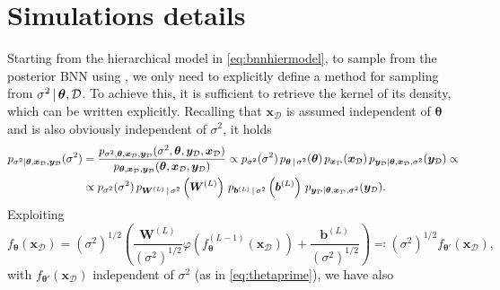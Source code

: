 \section{Simulations details} \label{sec:simulationsdetails}

Starting from the hierarchical model in \cref{eq:bnnhiermodel}, to sample from the posterior BNN using , we only need to explicitly define a method for sampling from $\sigma^2 \, | \, \bm{\theta}, \mathcal{D}$. 
To achieve this, it is sufficient to retrieve the kernel of its density, which can be written explicitly. 
Recalling that $\bm{x}_{\mathcal{D}}$ is assumed independent of $\bm{\theta}$ and is also obviously independent of $\sigma^2$, it holds
\begin{equation} \label{eq:conditionaldistsigmaprod}
	\begin{aligned}
		p_{\sigma^2 | \bm{\theta}, \bm{x}_{\mathcal{D}}, \bm{y}_{\mathcal{D}}}(\sigma^2) & = \frac{p_{\sigma^2, \bm{\theta}, \bm{x}_{\mathcal{D}}, \bm{y}_{\mathcal{D}}}(\sigma^2, \bm{\theta}, \bm{y}_{\mathcal{D}}, \bm{x}_{\mathcal{D}})}{p_{\bm{\theta}, \bm{x}_{\mathcal{D}}, \bm{y}_{\mathcal{D}}}(\bm{\theta}, \bm{x}_{\mathcal{D}}, \bm{y}_{\mathcal{D}})} \propto p_{\sigma^2}(\sigma^2) \, p_{\bm{\theta} \, | \, \sigma^2}(\bm{\theta}) \, p_{\bm{x}_{\mathcal{D}}}(\bm{x}_{\mathcal{D}}) \, p_{\bm{y}_{\mathcal{D}} | \bm{\theta}, \bm{x}_{\mathcal{D}}, \sigma^2}(\bm{y}_{\mathcal{D}}) \propto \\
		& \propto p_{\sigma^2}(\sigma^2) \, p_{\bm{W}^{(L)} \, | \, \sigma^2}\left(\bm{W}^{(L)}\right) \, p_{\bm{b}^{(L)} \, | \, \sigma^2}\left(\bm{b}^{(L)}\right) \,  p_{\bm{y}_{\mathcal{D}} | \bm{\theta}, \bm{x}_{\mathcal{D}}, \sigma^2}(\bm{y}_{\mathcal{D}}).
	\end{aligned}
\end{equation}
Exploiting
\begin{equation*}
	f_{\bm{\theta}}(\bm{x}_{\mathcal{D}}) = \left(\sigma^2\right)^{1/2} \left(\frac{\bm{W}^{(L)}}{\left(\sigma^2\right)^{1/2}} \varphi\left(f^{(L - 1)}_{\bm{\theta}}(\bm{x}_{\mathcal{D}})\right) + \frac{\bm{b}^{(L)}}{\left(\sigma^2\right)^{1/2}}\right) \eqcolon \left(\sigma^2\right)^{1/2} f_{\bm{\theta}'}(\bm{x}_{\mathcal{D}}),
\end{equation*}
with $f_{\bm{\theta}'}(\bm{x}_{\mathcal{D}})$ independent of $\sigma^2$ (as in \cref{eq:thetaprime}), we have also

